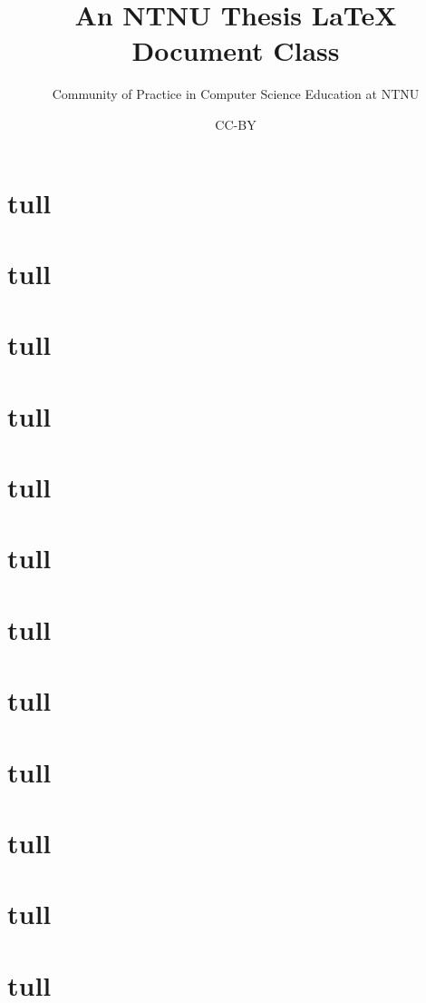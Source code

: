 \documentclass[british,titlepage,onepage]{ntnuthesis}
\title{An NTNU Thesis \LaTeX{} Document Class}
\author{Community of Practice in Computer Science Education at NTNU}
\date{CC-BY \ntnuthesisdate}
\begin{document}



\tableofcontents
\listoffigures
\listoftables
\lstlistoflistings

\printglossary[type=\acronymtype] %
\printglossary                    %






\section{tull}
\section{tull}
\section{tull}
\section{tull}
\section{tull}
\section{tull}
\section{tull}
\section{tull}
\section{tull}
\section{tull}
\section{tull}
\section{tull}
\end{document}

